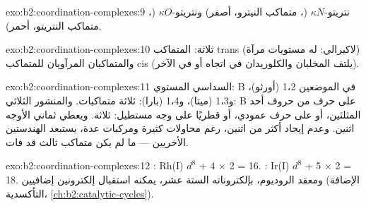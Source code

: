 \begin{solution}{exo:b2:coordination-complexes:9}
نتريتو-$\kappa N$ (، متماكب النيترو، أصفر) ونتريتو-$\kappa O$
(، متماكب النتريتو، أحمر).
\end{solution}

\begin{solution}{exo:b2:coordination-complexes:10}
ثلاثة: المتماكب trans (لاكيرالي: له مستويات مرآة) والمتماكبان المرآويان للمتماكب
cis (يلتف المخلبان والكلوريدان في اتجاه أو في الآخر).
\end{solution}

\begin{solution}{exo:b2:coordination-complexes:11}
السداسي المستوي: B في الموضعين 1،2 (أورثو)، و1،3 (ميتا)، و1،4 (بارا): ثلاثة متماكبات.
والمنشور الثلاثي: B على حرف من حروف أحد المثلثين، أو على حرف عمودي، أو قطريًا على
وجه مستطيل: ثلاثة. ويعطي ثماني الأوجه اثنين. وعدم إيجاد أكثر من اثنين، رغم
محاولات كثيرة ومركبات عدة، يستبعد الهندستين الأخريين --- ما لم يكن
متماكب ثالث قد فات.
\end{solution}

\begin{solution}{exo:b2:coordination-complexes:12}
: Rh(I) $d^8$ + 4 × 2 = 16. : Ir(I) $d^8$ + 5 × 2 =
18. ومعقد الروديوم، بإلكتروناته الستة عشر، يمكنه استقبال إلكترونين إضافيين (الإضافة التأكسدية،
\cref{ch:b2:catalytic-cycles}).
\end{solution}

